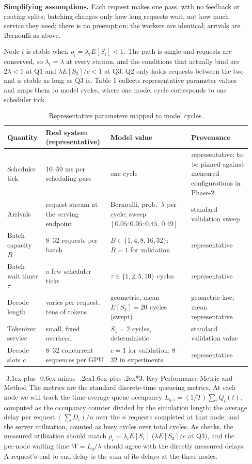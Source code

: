 \documentclass[11pt,a4paper]{article}
\makeatletter
\renewcommand\section{\@startsection{section}{1}{\z@}%
  {-3.1ex plus -0.6ex minus -.2ex}{1.6ex plus .2ex}{\normalfont\Large\bfseries}}
\makeatother
\begin{document}
\textbf{Simplifying assumptions.} Each request makes one pass, with no feedback or
routing splits; batching changes only how long requests wait, not how much service
they need; there is no preemption; the workers are identical; arrivals are
Bernoulli as above.

Node $i$ is stable when $\rho_i = \lambda_i E[S_i] < 1$. The path is single and
requests are conserved, so $\lambda_i = \lambda$ at every station, and the
conditions that actually bind are $2\lambda < 1$ at Q1 and $\lambda E[S_3]/c < 1$
at Q3. Q2 only holds requests between the two and is stable as long as Q3 is.
Table 1 collects representative parameter values and maps them to model cycles,
where one model cycle corresponds to one scheduler tick.

\begin{table}[H]
\centering\footnotesize
\caption{Representative parameters mapped to model cycles.}
\begin{tabular}{@{}p{2.5cm}p{4.5cm}p{4.9cm}p{4.3cm}@{}}
\toprule
Quantity & Real system (representative) & Model value & Provenance \\
\midrule
Scheduler tick & 10--50 ms per scheduling pass & one cycle & representative; to be pinned against measured configurations in Phase-2 \\
Arrivals & request stream at the serving endpoint & Bernoulli, prob.\ $\lambda$ per cycle; sweep $[0.05{:}0.05{:}0.45,\,0.49]$ & standard validation sweep \\
Batch capacity $B$ & 8--32 requests per batch & $B \in \{1,4,8,16,32\}$; $B=1$ for validation & representative \\
Batch wait timer $\tau$ & a few scheduler ticks & $\tau \in \{1,2,5,10\}$ cycles & representative \\
Decode length & varies per request, tens of tokens & geometric, mean $E[S_3]=20$ cycles (swept) & geometric law; mean representative \\
Tokenizer service & small, fixed overhead & $S_1 = 2$ cycles, deterministic & standard validation value \\
Decode slots $c$ & 8--32 concurrent sequences per GPU & $c=1$ for validation; 8--32 in experiments & representative \\
\bottomrule
\end{tabular}
\end{table}

\section*{3. Key Performance Metric and Method}
The metrics are the standard discrete-time queueing metrics. At each node we will
track the time-average queue occupancy $L_{q,i} = (1/T)\sum_t Q_i(t)$, computed as
the occupancy counter divided by the simulation length; the average delay per
request $(\sum D_i)/n$ over the $n$ requests completed at that node; and the server
utilization, counted as busy cycles over total cycles. As checks, the measured
utilization should match $\rho_i = \lambda_i E[S_i]$ ($\lambda E[S_3]/c$ at Q3),
and the per-node waiting time $W = L_q/\lambda$ should agree with the directly
measured delays. A request's end-to-end delay is the sum of its delays at the
three nodes.
\end{document}
